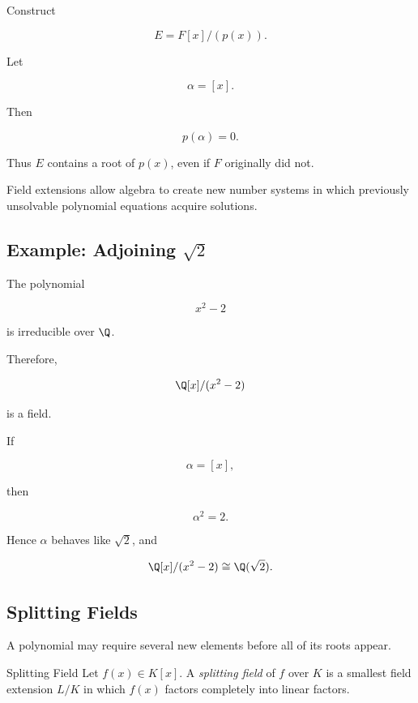 Construct

\[ E=F[x]/(p(x)). \]

Let

\[ \alpha=[x]. \]

Then

\[ p(\alpha)=0. \]

Thus \(E\) contains a root of \(p(x)\), even if \(F\) originally did not.

\begin{conceptbox}
Field extensions allow algebra to create new number systems in which
previously unsolvable polynomial equations acquire solutions.
\end{conceptbox}

\subsection{Example: Adjoining \(\sqrt2\)}
\label{subsec:quotient-q-sqrt2}

The polynomial

\[ x^2-2 \]

is irreducible over \(\Q\).

Therefore,

\[ \Q[x]/(x^2-2) \]

is a field.

If

\[ \alpha=[x], \]

then

\[ \alpha^2=2. \]

Hence \(\alpha\) behaves like \(\sqrt2\), and

\[ \Q[x]/(x^2-2)\cong\Q(\sqrt2). \]

\subsection{Splitting Fields}
\label{subsec:splitting-fields}

A polynomial may require several new elements before all of its roots appear.

\begin{definitionbox}{Splitting Field}
Let \(f(x)\in K[x]\). A \emph{splitting field} of \(f\) over \(K\) is a
smallest field extension \(L/K\) in which \(f(x)\) factors completely into
linear factors.
\end{definitionbox}

